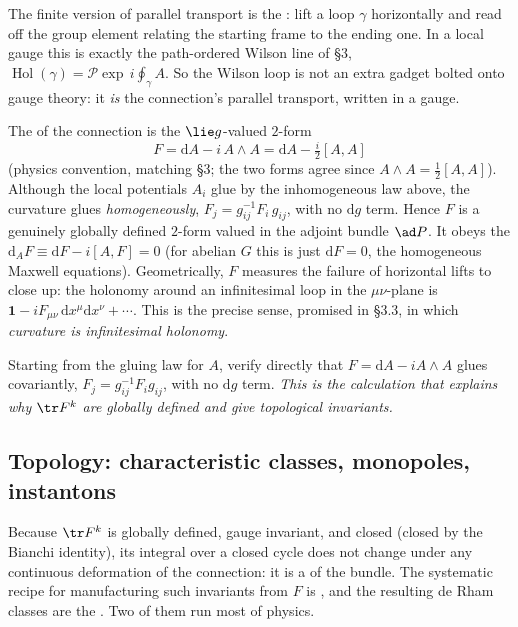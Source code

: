 \documentclass[11pt]{article}
\newcommand{\dd}{\mathrm{d}}                 %
\newcommand{\Pexp}{\mathcal{P}\!\exp}        %
\DeclareMathOperator{\Hol}{Hol}              %
\begin{document}
The finite version of parallel transport is the : lift a loop $\gamma$
horizontally and read off the group element relating the starting frame to the ending one.
In a local gauge this is exactly the path-ordered Wilson line of \S3,
$\Hol(\gamma)=\Pexp\,i\oint_\gamma A$. So the Wilson loop is not an extra gadget bolted
onto gauge theory: it \emph{is} the connection's parallel transport, written in a gauge.

\begin{ddefinition}[Curvature]
The  of the connection is the $\lie g$-valued $2$-form
\[
F = \dd A - i\,A\wedge A = \dd A - \tfrac{i}{2}[A,A]
\]
(physics convention, matching \S3; the two forms agree since $A\wedge A=\tfrac12[A,A]$).
Although the local potentials $A_i$ glue by the inhomogeneous law above, the curvature
glues \emph{homogeneously}, $F_j=g_{ij}^{-1}F_i\,g_{ij}$, with no $\dd g$ term. Hence $F$
is a genuinely globally defined $2$-form valued in the adjoint bundle $\ad P$. It obeys the
 $\dd_A F\equiv\dd F-i[A,F]=0$ (for abelian $G$ this is just
$\dd F=0$, the homogeneous Maxwell equations). Geometrically, $F$ measures the failure of
horizontal lifts to close up: the holonomy around an infinitesimal loop in the
$\mu\nu$-plane is $\mathbf 1-iF_{\mu\nu}\,\dd x^\mu\dd x^\nu+\cdots$. This is the precise
sense, promised in \S3.3, in which \emph{curvature is infinitesimal holonomy}.
\end{ddefinition}

\begin{xca}
Starting from the gluing law for $A$, verify directly that $F=\dd A - iA\wedge A$ glues
covariantly, $F_j = g_{ij}^{-1}F_i g_{ij}$, with no $\dd g$ term. \emph{This is the
calculation that explains why $\tr F^k$ are globally defined and give topological
invariants.}
\end{xca}

\subsection{Topology: characteristic classes, monopoles, instantons}
\label{sec:topology}

Because $\tr F^k$ is globally defined, gauge invariant, and closed (closed by the Bianchi
identity), its integral over a closed cycle does not change under any continuous
deformation of the connection: it is a  of the bundle. The
systematic recipe for manufacturing such invariants from $F$ is , and the resulting de Rham classes are the . Two of
them run most of physics.
\end{document}
